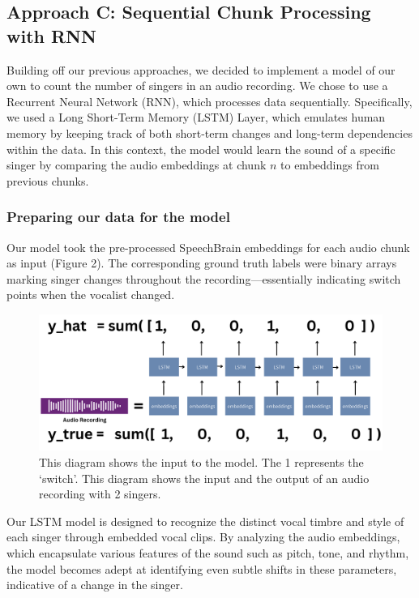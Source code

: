 \documentclass[conference]{IEEEtran}
\begin{document}
\subsection{Approach C: Sequential Chunk Processing with RNN}

Building off our previous approaches, we decided to implement a model of our own to count the number of singers in an audio recording. We chose to use a Recurrent Neural Network (RNN), which processes data sequentially. Specifically, we used a Long Short-Term Memory (LSTM) Layer, which emulates human memory by keeping track of both short-term changes and long-term dependencies within the data. In this context, the model would learn the sound of a specific singer by comparing the audio embeddings at chunk $n$ to embeddings from previous chunks.

\subsubsection{Preparing our data for the model}
Our model took the pre-processed SpeechBrain embeddings for each audio chunk as input (Figure 2). The corresponding ground truth labels were binary arrays marking singer changes throughout the recording—essentially indicating switch points when the vocalist changed.

\begin{figure}[ht]
    \centering
    \includegraphics[scale=0.25]{RNNdata.png}
    \caption{This diagram shows the input to the model. The 1 represents the `switch'. This diagram shows the input and the output of an audio recording with 2 singers.}
    \label{fig:embeddings}
\end{figure}

Our LSTM model is designed to recognize the distinct vocal timbre and style of each singer through embedded vocal clips. By analyzing the audio embeddings, which encapsulate various features of the sound such as pitch, tone, and rhythm, the model becomes adept at identifying even subtle shifts in these parameters, indicative of a change in the singer. 
\end{document}

